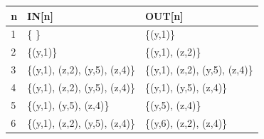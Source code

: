 \begin{frame}[fragile, t]
	\begin{columns}[T]
		\begin{column}[T]{.3\textwidth}
			\vspace{0pt}
			
		\end{column}
		\begin{column}[T]{.7\textwidth}
			\vspace{0pt}    
			\begin{scriptsize}
				\begin{table}[]
					\begin{tabular}{|l|l|l|}
						\hline
						n  & IN{[}n{]} & OUT{[}n{]} \\ \hline
						1  & \pause \{ \}                          & \pause \{(y,1)\} \\ \hline
						2  & \pause \{(y,1)\}                      & \pause \{(y,1), (z,2)\} \\ \hline
						3  & \pause \{(y,1), (z,2), (y,5), (z,4)\} & \pause \{(y,1), (z,2), (y,5), (z,4)\} \\ \hline
						4  & \pause \{(y,1), (z,2), (y,5), (z,4)\} & \pause \{(y,1), (y,5), (z,4)\} \\ \hline
						5  & \pause \{(y,1), (y,5), (z,4)\}        & \pause \{(y,5), (z,4)\} \\ \hline
						6  & \pause \{(y,1), (z,2), (y,5), (z,4)\} & \pause \{(y,6), (z,2), (z,4)\} \\ \hline
					\end{tabular}
				\end{table}   
			\end{scriptsize}
		\end{column}
		
	\end{columns}
	
\end{frame}



